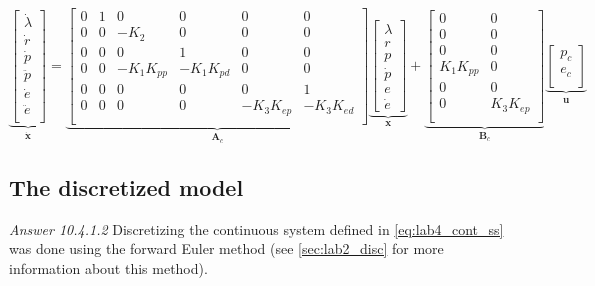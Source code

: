 \documentclass[../main.tex]{subfiles}
\begin{document}
\begin{equation}\label{eq:lab4_cont_ss}
	\underbrace{\begin{bmatrix}
			\dot \lambda \\
			\dot r \\
			\dot p \\
			\ddot p \\
			\dot e \\
			\ddot e \\
	\end{bmatrix}}_{\bm{\dot x}} = 
	\underbrace{
		\begin{bmatrix}
			0 & 1 & 0 & 0 & 0 & 0\\
			0 & 0 & -K_2 & 0 & 0 & 0\\
			0 & 0 & 0 & 1 & 0 & 0\\
			0 & 0 & -K_1 K_{pp} &  -K_1 K_{pd} & 0 & 0\\
			0 & 0 & 0 & 0 & 0 & 1 \\
			0 & 0 & 0 & 0 & -K_3K_{ep} & -K_3K_{ed} \\
		\end{bmatrix}
	}_{\bm A_c}
	\underbrace{
		\begin{bmatrix}
			\lambda \\ r \\ p \\ \dot{p} \\ e \\ \dot{e}
		\end{bmatrix}
	}_{\bm x}
	+
	\underbrace{
		\begin{bmatrix}
			0 & 0 \\
			0 & 0\\
			0 & 0\\
			K_1 K_{pp} & 0\\
			0 & 0 \\
			0 & K_3K_{ep} \\
		\end{bmatrix}
	}_{\bm B_c} 
	\underbrace{
		\begin{bmatrix}
			p_c \\
			e_c \\
		\end{bmatrix}
	}_{\bm u}
\end{equation}

\subsection{The discretized model}
\textit{Answer 10.4.1.2}
Discretizing the continuous system defined in \cref{eq:lab4_cont_ss} was done using the forward Euler method (see \cref{sec:lab2_disc} for more information about this method).
\end{document}
